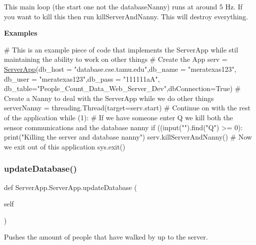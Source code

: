 This main loop (the start one not the database\+Nanny) runs at around 5 Hz. If you want to kill this then run kill\+Server\+And\+Nanny. This will destroy everything.

{\bfseries Examples} 
\begin{DoxyCode}
\textcolor{comment}{# This is an example piece of code that implements the ServerApp while stil maintaining the ability to work
       on other things}
\textcolor{comment}{# Create the App}
serv = \mbox{\hyperlink{namespace_server_app}{ServerApp}}(db\_host = \textcolor{stringliteral}{"database.cse.tamu.edu"},db\_name = \textcolor{stringliteral}{"meratexas123"},
     db\_user = \textcolor{stringliteral}{"meratexas123"},db\_pass = \textcolor{stringliteral}{"111111aA"},
     db\_table=\textcolor{stringliteral}{"People\_Count\_Data\_Web\_Server\_Dev"},dbConnection=\textcolor{keyword}{True})
\textcolor{comment}{# Create a Nanny to deal with the ServerApp while we do other things}
serverNanny = threading.Thread(target=serv.start)
\textcolor{comment}{# Continue on with the rest of the application}
\textcolor{keywordflow}{while} (1):
    \textcolor{comment}{# If we have someone enter Q we kill both the sensor communications and the database nanny}
    \textcolor{keywordflow}{if} ((input(\textcolor{stringliteral}{""}).find(\textcolor{stringliteral}{"Q"}) >= 0):
        print(\textcolor{stringliteral}{"Killing the server and database nanny"})
        serv.killServerAndNanny()
        \textcolor{comment}{# Now we exit out of this application}
        sys.exit()
\end{DoxyCode}
 \mbox{\label{class_server_app_1_1_server_app_a648c098cf7d409cceb017a196b1d0db3}} 
\subsubsection{\texorpdfstring{update\+Database()}{updateDatabase()}}
{\footnotesize\ttfamily def Server\+App.\+Server\+App.\+update\+Database (\begin{DoxyParamCaption}\item[{}]{self }\end{DoxyParamCaption})}



Pushes the amount of people that have walked by up to the server. 

